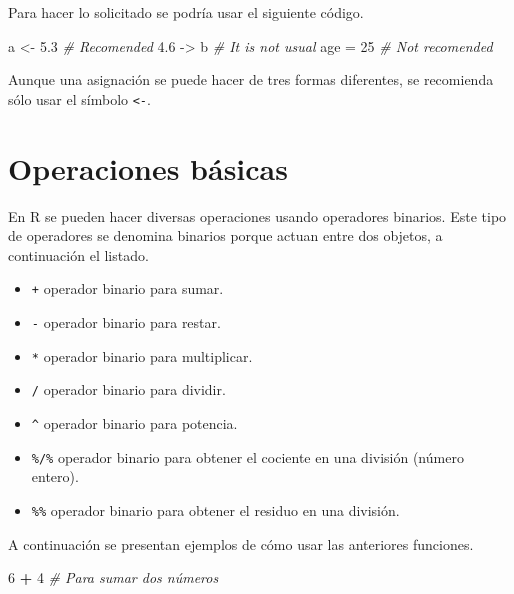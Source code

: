 \documentclass[10pt,]{krantz}
\makeatletter
\newenvironment{Shaded}{\begin{snugshade}}{\end{snugshade}}
\newcommand{\DecValTok}[1]{\textcolor[rgb]{0.00,0.00,0.81}{#1}}
\newcommand{\FloatTok}[1]{\textcolor[rgb]{0.00,0.00,0.81}{#1}}
\newcommand{\StringTok}[1]{\textcolor[rgb]{0.31,0.60,0.02}{#1}}
\newcommand{\CommentTok}[1]{\textcolor[rgb]{0.56,0.35,0.01}{\textit{#1}}}
\newcommand{\OperatorTok}[1]{\textcolor[rgb]{0.81,0.36,0.00}{\textbf{#1}}}
\newcommand{\NormalTok}[1]{#1}
\providecommand{\tightlist}{%
  \setlength{\itemsep}{0pt}\setlength{\parskip}{0pt}}
\let\proglang=\textsf
\newenvironment{kframe}{%
\medskip{}
\setlength{\fboxsep}{.8em}
 \def\at@end@of@kframe{}%
 \ifinner\ifhmode%
  \def\at@end@of@kframe{\end{minipage}}%
  \begin{minipage}{\columnwidth}%
 \fi\fi%
 \def\FrameCommand##1{\hskip\@totalleftmargin \hskip-\fboxsep
 \colorbox{shadecolor}{##1}\hskip-\fboxsep
     \hskip-\linewidth \hskip-\@totalleftmargin \hskip\columnwidth}%
 \MakeFramed {\advance\hsize-\width
   \@totalleftmargin\z@ \linewidth\hsize
   \@setminipage}}%
 {\par\unskip\endMakeFramed%
 \at@end@of@kframe}
\renewenvironment{Shaded}{\begin{kframe}}{\end{kframe}}
\let\BeginKnitrBlock\begin \let\EndKnitrBlock\end
\makeatother
\begin{document}
Para hacer lo solicitado se podría usar el siguiente código.

\begin{Shaded}
\begin{Highlighting}[]
\NormalTok{a <-}\StringTok{ }\FloatTok{5.3} \CommentTok{# Recomended}
\FloatTok{4.6}\NormalTok{ ->}\StringTok{ }\NormalTok{b }\CommentTok{# It is not usual}
\NormalTok{age =}\StringTok{ }\DecValTok{25} \CommentTok{# Not recomended}
\end{Highlighting}
\end{Shaded}

\BeginKnitrBlock{rmdimportant}
Aunque una asignación se puede hacer de tres formas diferentes, se
recomienda sólo usar el símbolo \texttt{\textless{}-}.
\EndKnitrBlock{rmdimportant}

\section{\texorpdfstring{Operaciones básicas
}{Operaciones básicas }}\label{operaciones-basicas}

En \proglang{R} se pueden hacer diversas operaciones usando operadores
binarios. Este tipo de operadores se denomina binarios porque actuan
entre dos objetos, a continuación el listado.

\begin{itemize}
\tightlist
\item
  \texttt{+} operador binario para sumar.
\item
  \texttt{-} operador binario para restar.
\item
  \texttt{*} operador binario para multiplicar.
\item
  \texttt{/} operador binario para dividir.
\item
  \texttt{\^{}} operador binario para potencia.
\item
  \texttt{\%/\%} operador binario para obtener el cociente en una
  división (número entero).
\item
  \texttt{\%\%} operador binario para obtener el residuo en una
  división.
\end{itemize}

A continuación se presentan ejemplos de cómo usar las anteriores
funciones.

\begin{Shaded}
\begin{Highlighting}[]
\DecValTok{6} \OperatorTok{+}\StringTok{ }\DecValTok{4}  \CommentTok{# Para sumar dos números}
\end{Highlighting}
\end{Shaded}
\end{document}
